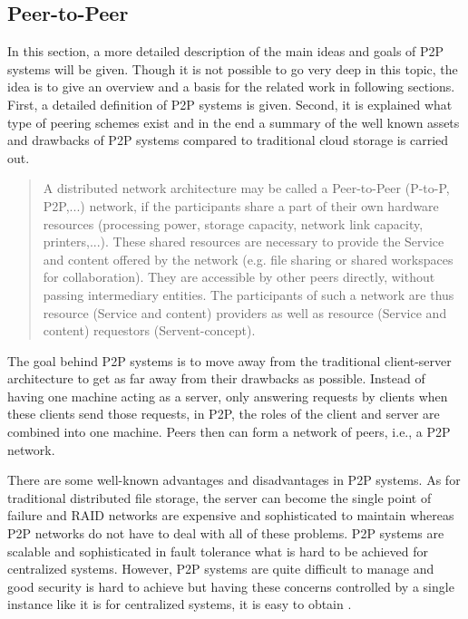 \subsection{Peer-to-Peer}
\label{subsec:peer-to-peer}
In this section, a more detailed description of the main ideas and goals of P2P systems will be given. Though it is not possible to go very deep in this topic, the idea is to give an overview and a basis for the related work in following sections. First, a detailed definition of P2P systems is given. Second, it is explained what type of peering schemes exist and in the end a summary of the well known assets and drawbacks of P2P systems compared to traditional cloud storage is carried out.
\begin{quote}
A distributed network architecture may be called a Peer-to-Peer (P-to-P, P2P,...) network, if the participants share a part of their own hardware resources (processing power, storage capacity, network link capacity, printers,...). These shared resources are necessary to provide the Service and content offered by the network (e.g. file sharing or shared workspaces for collaboration). They are accessible by other peers directly, without passing intermediary entities. The participants of such a network are thus resource (Service and content) providers as well as resource (Service and content) requestors (Servent-concept). \cite{p2p:definition}
\end{quote}
The goal behind P2P systems is to move away from the traditional client-server architecture to get as far away from their drawbacks as possible. Instead of having one machine acting as a server, only answering requests by clients when these clients send those requests, in P2P, the roles of the client and server are combined into one machine. Peers then can form a network of peers, i.e., a P2P network.

There are some well-known advantages and disadvantages in P2P systems. As for traditional distributed file storage, the server can become the single point of failure and RAID networks are expensive and sophisticated to maintain whereas P2P networks do not have to deal with all of these problems. P2P systems are scalable and sophisticated in fault tolerance what is hard to be achieved for centralized systems. However, P2P systems are quite difficult to manage and good security is hard to achieve but having these concerns controlled by a single instance like it is for centralized systems, it is easy to obtain \cite{openp2p:p2p_introduction}.

